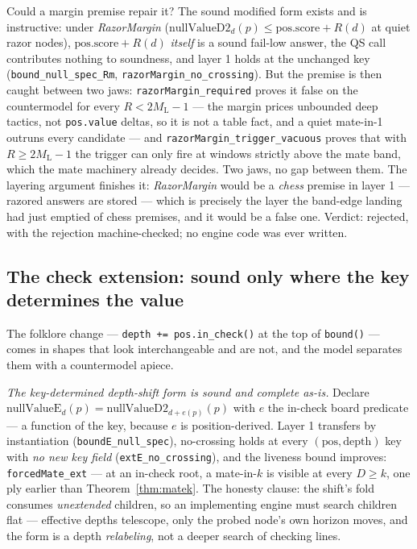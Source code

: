 \documentclass[11pt]{article}
\newcommand{\ML}{M_{\mathrm{L}}}    %
\theoremstyle{plain}
\theoremstyle{definition}
\theoremstyle{remark}
\begin{document}
Could a margin premise repair it?  The sound modified form exists and
is instructive: under \emph{RazorMargin} ($\mathrm{nullValueD2}_d(p)
\le \mathrm{pos.score} + R(d)$ at quiet razor nodes),
$\mathrm{pos.score} + R(d)$ \emph{itself} is a sound fail-low answer,
the QS call contributes nothing to soundness, and layer 1 holds at
the unchanged key (\texttt{bound\_null\_spec\_Rm},
\texttt{razorMargin\_no\_crossing}).  But the premise is then caught
between two jaws: \texttt{razorMargin\_required} proves it false on
the countermodel for every $R < 2\ML - 1$ --- the margin prices
unbounded deep tactics, not \texttt{pos.value} deltas, so it is not a
table fact, and a quiet mate-in-1 outruns every candidate --- and
\texttt{razorMargin\_trigger\_vacuous} proves that with
$R \ge 2\ML - 1$ the trigger can only fire at windows strictly above
the mate band, which the mate machinery already decides.  Two jaws,
no gap between them.  The layering argument finishes it:
\emph{RazorMargin} would be a \emph{chess} premise in layer 1 ---
razored answers are stored --- which is precisely the layer the
band-edge landing had just emptied of chess premises, and it would be
a false one.  Verdict: rejected, with the rejection machine-checked;
no engine code was ever written.

\subsection{The check extension: sound only where the key determines
the value}
\label{sec:checkext}

The folklore change --- \texttt{depth += pos.in\_check()} at the top
of \texttt{bound()} --- comes in shapes that look interchangeable and
are not, and the model separates them with a countermodel apiece.

\emph{The key-determined depth-shift form is sound and complete
as-is.}  Declare $\mathrm{nullValueE}_d(p) =
\mathrm{nullValueD2}_{d + e(p)}(p)$ with $e$ the in-check board
predicate --- a function of the key, because $e$ is
position-derived.  Layer 1 transfers by instantiation
(\texttt{boundE\_null\_spec}), no-crossing holds at every
$(\mathrm{pos},\mathrm{depth})$ key with \emph{no new key field}
(\texttt{extE\_no\_crossing}), and the liveness bound improves:
\texttt{forcedMate\_ext} --- at an in-check root, a mate-in-$k$ is
visible at every $D \ge k$, one ply earlier than
Theorem~\ref{thm:matek}.  The honesty clause: the shift's fold
consumes \emph{unextended} children, so an implementing engine must
search children flat --- effective depths telescope, only the probed
node's own horizon moves, and the form is a depth
\emph{relabeling}, not a deeper search of checking lines.
\end{document}
